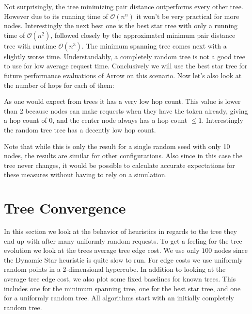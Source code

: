 \documentclass[a4paper, oneside]{discothesis}
\begin{document}
Not surprisingly, the tree minimizing pair distance outperforms every other tree. However due to its running time of $\mathcal{O}(n^n)$ it won't be very practical for more nodes. Interestingly the next best one is the best star tree with only a running time of $\mathcal{O}(n^2)$, followed closely by the approximated minimum pair distance tree with runtime $\mathcal{O}(n^3)$. The minimum spanning tree comes next with a slightly worse time. Understandably, a completely random tree is not a good tree to use for low average request time. Conclusively we will use the best star tree for future performance evaluations of Arrow on this scenario. Now let's also look at the number of hops for each of them:


As one would expect from trees it has a very low hop count. This value is lower than $2$ because nodes can make requests when they have the token already, giving a hop count of $0$, and the center node always has a hop count $\leq 1$. Interestingly the random tree tree has a decently low hop count.

Note that while this is only the result for a single random seed with only 10 nodes, the results are similar for other configurations. Also since in this case the tree never changes, it would be possible to calculate accurate expectations for these measures without having to rely on a simulation.

\section{Tree Convergence}\label{result:convergence}

In this section we look at the behavior of heuristics in regards to the tree they end up with after many uniformly random requests. To get a feeling for the tree evolution we look at the trees average tree edge cost. We use only $100$ nodes since the Dynamic Star heuristic is quite slow to run. For edge costs we use uniformly random points in a 2-dimensional hypercube. In addition to looking at the average tree edge cost, we also plot some fixed baselines for known trees. This includes one for the minimum spanning tree, one for the best star tree, and one for a uniformly random tree. All algorithms start with an initially completely random tree.
\end{document}
